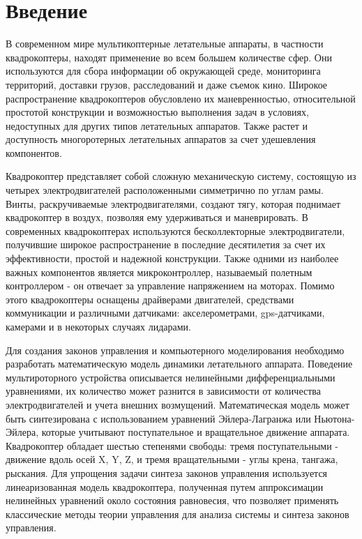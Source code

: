 \chapter*{Введение}
\label{ch:chap1}



В современном мире мультикоптерные летательные аппараты, 
в частности квадрокоптеры, находят применение во всем большем количестве 
сфер. Они используются для сбора информации об окружающей 
среде, мониторинга территорий, доставки грузов, расследований
и даже съемок кино. 
Широкое распространение квадрокоптеров обусловлено 
их маневренностью, относительной простотой конструкции и 
возможностью выполнения задач в условиях, недоступных 
для других типов летательных аппаратов. Также растет и доступность многоротерных 
летательных аппаратов за счет удешевления компонентов.

Квадрокоптер представляет собой сложную механическую систему, состоящую из 
четырех электродвигателей расположенными симметрично по углам рамы. 
Винты, раскручиваемые электродвигателями, создают тягу, которая поднимает квадрокоптер в воздух, 
позволяя ему удерживаться и маневрировать. В современных квадрокоптерах 
используются бесколлекторные электродвигатели, получившие широкое 
распространение в последние десятилетия за счет их эффективности, 
простой и надежной конструкции. Также одними из наиболее важных 
компонентов является микроконтроллер, называемый полетным контроллером - 
он отвечает за управление напряжением на моторах. Помимо этого квадрокоптеры 
оснащены драйверами двигателей, средствами коммуникации и различными датчиками: 
акселерометрами, gps-датчиками, камерами и в некоторых случаях лидарами.

Для создания законов управления и компьютерного моделирования необходимо разработать
математическую модель динамики летательного аппарата. Поведение мультироторного 
устройства описывается нелинейными дифференциальными уравнениями, их 
количество может разнится в зависимости от количества электродвигателей 
и учета внешних возмущений. Математическая модель может быть синтезирована с использованием 
уравнений Эйлера-Лагранжа или Ньютона-Эйлера, которые учитывают поступательное и 
вращательное движение аппарата.  Квадрокоптер обладает шестью степенями свободы:
тремя поступательными - движение вдоль осей X, Y, Z, и тремя вращательными - углы крена, тангажа, рыскания.
Для упрощения задачи синтеза законов управления  используется 
линеаризованная модель квадрокоптера, полученная путем аппроксимации 
нелинейных уравнений около состояния равновесия, что позволяет применять 
классические методы теории управления для анализа системы и синтеза законов управления.


